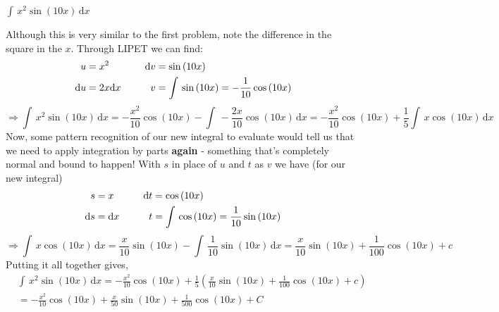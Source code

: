 \documentclass[addpoints]{exam}
\theoremstyle{definition}
\theoremstyle{plain}
\begin{document}
\begin{questions}
    \ifprintanswers
    \else
        \newpage
    \fi

    \question $\displaystyle \int\,x^{2}\sin\left(10x\right)\,\mathrm{d}x$
    \begin{solution}[\stretch{1}]
        Although this is very similar to the first problem, note the difference in the square in the $x$. Through LIPET we can find:
        \begin{align*}
            u &= x^2 &\hspace{0.2in} \mathrm{d}v &= \sin\left(10x\right) \\
            \mathrm{d}u &= 2x\mathrm{d}x &\hspace{0.2in} v &= \int\,\sin\left(10x\right) = -\frac{1}{10}\cos\left(10x\right)
        \end{align*}
        \[
            \Rightarrow \int\,x^2\sin\left(10x\right)\,\mathrm{d}x = -\frac{x^2}{10}\cos\left(10x\right) - \int\,-\frac{2x}{10}\cos\left(10x\right)\,\mathrm{d}x = -\frac{x^2}{10}\cos\left(10x\right) + \frac{1}{5}\int\,x\cos\left(10x\right)\,\mathrm{d}x
        \]
        Now, some pattern recognition of our new integral to evaluate would tell us that we need to apply integration by parts \textbf{again} - something that's completely normal and bound to happen! With $s$ in place of $u$ and $t$ as $v$ we have (for our new integral)
        \begin{align*}
            s &= x &\hspace{0.2in} \mathrm{d}t &= \cos\left(10x\right) \\
            \mathrm{d}s &= \mathrm{d}x &\hspace{0.2in} t &= \int\,\cos\left(10x\right) = \frac{1}{10}\sin\left(10x\right)
        \end{align*}
        \[
            \Rightarrow \int\,x\cos\left(10x\right)\,\mathrm{d}x = \frac{x}{10}\sin\left(10x\right) - \int\,\frac{1}{10}\sin\left(10x\right)\,\mathrm{d}x = \frac{x}{10}\sin\left(10x\right) + \frac{1}{100}\cos\left(10x\right) + c
        \]
        Putting it all together gives,
        \begin{align*}
        &\int\,x^{2}\sin\left(10x\right)\,\mathrm{d}x = -\frac{x^2}{10}\cos\left(10x\right) + \frac{1}{5}\left(\frac{x}{10}\sin\left(10x\right) + \frac{1}{100}\cos\left(10x\right) + c\right) \\ &= \boxed{-\frac{x^2}{10}\cos\left(10x\right) + \frac{x}{50}\sin\left(10x\right) + \frac{1}{500}\cos\left(10x\right) + C}
        \end{align*}
    \end{solution}
\end{questions}
\end{document}
